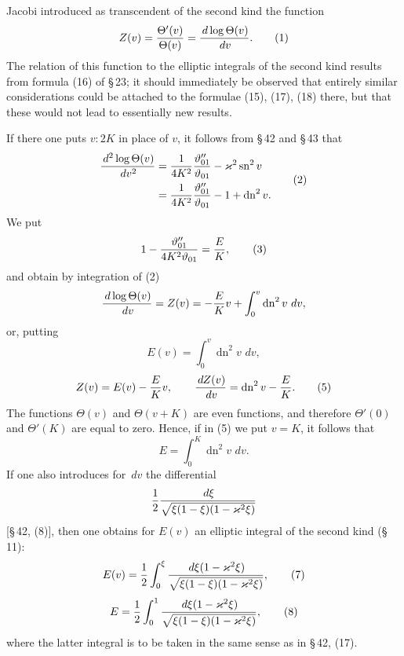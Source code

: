 \documentclass[11pt]{article}
\providecommand{\dd}{\,d}
\providecommand{\tht}{\vartheta}
\providecommand{\sn}{\operatorname{sn}}
\providecommand{\dn}{\operatorname{dn}}
\begin{document}
Jacobi introduced as transcendent of the second kind the function
\begin{equation}
 Z(v)={\Theta'(v)\over\Theta(v)}={\dd\log\Theta(v)\over\dd v}.
\tag{1}
\end{equation}
The relation of this function to the elliptic integrals of the second kind results from formula (16) of \S\,23; it should immediately be observed that entirely similar considerations could be attached to the formulae (15), (17), (18) there, but that these would not lead to essentially new results.

If there one puts $v:2K$ in place of $v$, it follows from \S\,42 and \S\,43 that
\begin{equation}
\begin{aligned}
{\dd^2\log\Theta(v)\over\dd v^2}
&={1\over4K^2}{\tht_{01}''\over\tht_{01}}-\varkappa^2\sn^2v\\
&={1\over4K^2}{\tht_{01}''\over\tht_{01}}-1+\dn^2v.
\end{aligned}
\tag{2}
\end{equation}
We put
\begin{equation}
1-{\tht_{01}''\over4K^2\tht_{01}}={E\over K},
\tag{3}
\end{equation}
and obtain by integration of (2)
\[
{\dd\log\Theta(v)\over\dd v}=Z(v)=-{E\over K}v+\int_0^v\dn^2v\,\dd v,
\]
or, putting
\begin{equation}
E(v)=\int_0^v \dn^2v\,\dd v,
\tag{4}
\end{equation}
\begin{equation}
Z(v)=E(v)-{E\over K}v,
\qquad
{\dd Z(v)\over\dd v}=\dn^2v-{E\over K}.
\tag{5}
\end{equation}
The functions $\Theta(v)$ and $\Theta(v+K)$ are even functions, and therefore $\Theta'(0)$ and $\Theta'(K)$ are equal to zero. Hence, if in (5) we put $v=K$, it follows that
\begin{equation}
E=\int_0^K\dn^2v\,\dd v.
\tag{6}
\end{equation}
If one also introduces for $\dd v$ the differential
\[
{1\over2}{\dd\xi\over\sqrt{\xi(1-\xi)(1-\varkappa^2\xi)}}
\]
[\S\,42, (8)], then one obtains for $E(v)$ an elliptic integral of the second kind (\S\,11):
\begin{equation}
E(v)={1\over2}\int_0^{\xi}{\dd\xi(1-\varkappa^2\xi)\over\sqrt{\xi(1-\xi)(1-\varkappa^2\xi)}},
\tag{7}
\end{equation}
\begin{equation}
E={1\over2}\int_0^{1}{\dd\xi(1-\varkappa^2\xi)\over\sqrt{\xi(1-\xi)(1-\varkappa^2\xi)}},
\tag{8}
\end{equation}
where the latter integral is to be taken in the same sense as in \S\,42, (17).
\end{document}
